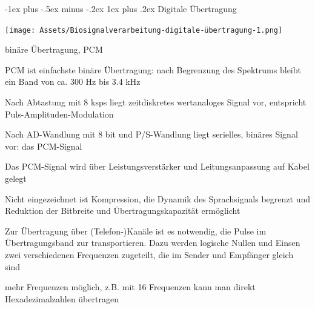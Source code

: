 \documentclass[a4paper]{article}
\makeatletter
\renewcommand{\subsubsection}{\@startsection{subsubsection}{3}{0mm}%
 {-1ex plus -.5ex minus -.2ex}%
 {1ex plus .2ex}%
 {\normalfont\small\bfseries}}
\makeatother
\begin{document}
\begin{multicols}{3}
  \subsubsection{Digitale Übertragung}\label{digitale-uxfcbertragung}
  \begin{center}
    \texttt{[image: Assets/Biosignalverarbeitung-digitale-übertragung-1.png]}
  \end{center}
  binäre Übertragung, PCM
  \begin{itemize*}
    \item PCM ist einfachste binäre Übertragung: nach Begrenzung des Spektrums bleibt ein Band von ca. 300 Hz bis 3.4 kHz
    \begin{itemize*}
      \item Nach Abtastung mit 8 ksps liegt zeitdiskretes wertanaloges Signal vor, entspricht Puls-Amplituden-Modulation
      \item Nach AD-Wandlung mit 8 bit und P/S-Wandlung liegt serielles, binäres Signal vor: das PCM-Signal
      \item Das PCM-Signal wird über Leistungsverstärker und Leitungsanpassung auf Kabel gelegt
      \item Nicht eingezeichnet ist Kompression, die Dynamik des Sprachsignals begrenzt und Reduktion der Bitbreite und Übertragungskapazität ermöglicht
    \end{itemize*}
    \item Zur Übertragung über (Telefon-)Kanäle ist es notwendig, die Pulse im Übertragungsband zur transportieren. Dazu werden logische Nullen und Einsen zwei verschiedenen Frequenzen zugeteilt, die im Sender und Empfänger gleich sind
    \item mehr Frequenzen möglich, z.B. mit 16 Frequenzen kann man direkt Hexadezimalzahlen übertragen
  \end{itemize*}


\end{multicols}
\end{document}
